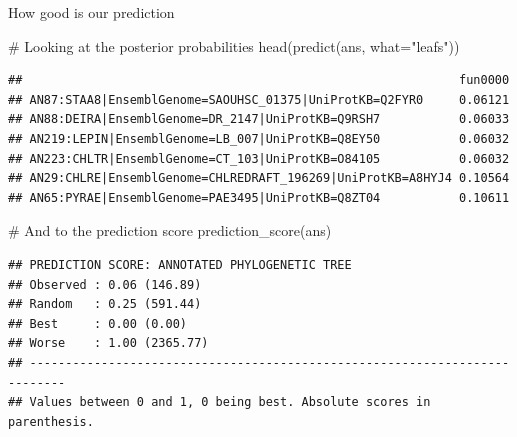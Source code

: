 \documentclass[9pt,handout,ignorenonframetext,]{beamer}
\newenvironment{Shaded}{\begin{snugshade}}{\end{snugshade}}
\newcommand{\KeywordTok}[1]{\textcolor[rgb]{0.94,0.87,0.69}{#1}}
\newcommand{\DataTypeTok}[1]{\textcolor[rgb]{0.87,0.87,0.75}{#1}}
\newcommand{\StringTok}[1]{\textcolor[rgb]{0.80,0.58,0.58}{#1}}
\newcommand{\CommentTok}[1]{\textcolor[rgb]{0.50,0.62,0.50}{#1}}
\newcommand{\NormalTok}[1]{\textcolor[rgb]{0.80,0.80,0.80}{#1}}
\begin{document}
\begin{frame}[fragile,t]{How good is our prediction}

\footnotesize

\begin{Shaded}
\begin{Highlighting}[]
\CommentTok{# Looking at the posterior probabilities}
\KeywordTok{head}\NormalTok{(}\KeywordTok{predict}\NormalTok{(ans, }\DataTypeTok{what=}\StringTok{"leafs"}\NormalTok{))}
\end{Highlighting}
\end{Shaded}

\begin{verbatim}
##                                                             fun0000
## AN87:STAA8|EnsemblGenome=SAOUHSC_01375|UniProtKB=Q2FYR0     0.06121
## AN88:DEIRA|EnsemblGenome=DR_2147|UniProtKB=Q9RSH7           0.06033
## AN219:LEPIN|EnsemblGenome=LB_007|UniProtKB=Q8EY50           0.06032
## AN223:CHLTR|EnsemblGenome=CT_103|UniProtKB=O84105           0.06032
## AN29:CHLRE|EnsemblGenome=CHLREDRAFT_196269|UniProtKB=A8HYJ4 0.10564
## AN65:PYRAE|EnsemblGenome=PAE3495|UniProtKB=Q8ZT04           0.10611
\end{verbatim}

\begin{Shaded}
\begin{Highlighting}[]
\CommentTok{# And to the prediction score}
\KeywordTok{prediction_score}\NormalTok{(ans)}
\end{Highlighting}
\end{Shaded}

\begin{verbatim}
## PREDICTION SCORE: ANNOTATED PHYLOGENETIC TREE
## Observed : 0.06 (146.89)
## Random   : 0.25 (591.44)
## Best     : 0.00 (0.00)
## Worse    : 1.00 (2365.77)
## ---------------------------------------------------------------------------
## Values between 0 and 1, 0 being best. Absolute scores in parenthesis.
\end{verbatim}

\normalsize

\end{frame}
\end{document}
